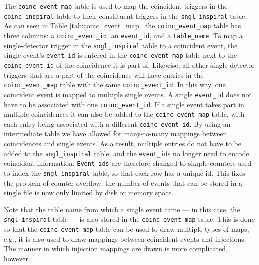The \texttt{coinc\_event\_map} table is used to map the coincident triggers in
the \\
\texttt{coinc\_inspiral} table to their constituent triggers in the
\texttt{sngl\_inspiral} table. As can seen in Table \ref{tab:coinc_event_map},
the \texttt{coinc\_event\_map} table has three columns: a
\texttt{coinc\_event\_id}, an \texttt{event\_id}, and a \texttt{table\_name}.
To map a single-detector trigger in the \texttt{sngl\_inspiral} table to a
coincident event, the single event's \texttt{event\_id} is entered in the
\texttt{coinc\_event\_map} table next to the \texttt{coinc\_event\_id} of the
coincidence it is part of. Likewise, all other single-detector triggers that
are a part of the coincidence will have entries in the
\texttt{coinc\_event\_map} table with the same \texttt{coinc\_event\_id}. In
this way, one coincident event is mapped to multiple single events. A single
\texttt{event\_id} does not have to be associated with one
\texttt{coinc\_event\_id}. If a single event takes part in multiple
coincidences it can also be added to the \texttt{coinc\_event\_map} table, with
each entry being associated with a different \texttt{coinc\_event\_id}. By
using an intermediate table we have allowed for many-to-many mappings between
coincidences and single events. As a result, multiple entries do not have to be
added to the \texttt{sngl\_inspiral} table, and the \texttt{event\_id}s no
longer need to encode coincident information. \texttt{Event\_ids} are therefore
changed to simple counters used to index the \texttt{sngl\_inspiral} table, so
that each row has a unique id. This fixes the problem of counter-overflow; the
number of events that can be stored in a single file is now only limited by
disk or memory space.

Note that the table name from which a single event came --- in this case, the
\texttt{sngl\_inspiral} table --- is also stored in the
\texttt{coinc\_event\_map} table. This is done so that the
\texttt{coinc\_event\_map} table can be used to draw multiple types of maps,
e.g., it is also used to draw mappings between coincident events and
injections. The manner in which injection mappings are drawn is more
complicated, however.


